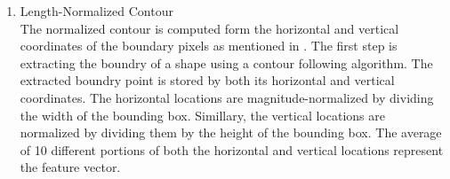 \documentclass[conference]{IEEEtran}
\begin{document}
\begin{enumerate}
%
\item Length-Normalized Contour \\
The normalized contour is computed form the horizontal and vertical coordinates of the boundary pixels as mentioned in  \cite{ElSherif2007}. The first step is extracting the boundry of a shape using a contour following algorithm. The extracted boundry point is stored by both its horizontal and vertical coordinates.  The horizontal locations are magnitude-normalized by dividing the width of the bounding box. Simillary, the vertical locations are normalized by dividing them by the height of the bounding box. The average of 10 different portions of both the horizontal and vertical locations represent the feature vector. %



\end{enumerate}
\end{document}
